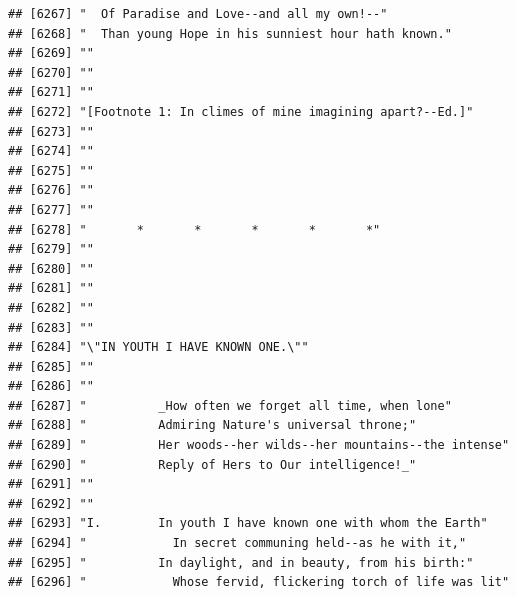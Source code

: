 \documentclass{article}\usepackage[]{graphicx}\usepackage[]{color}
\makeatletter
\newenvironment{kframe}{%
 \def\at@end@of@kframe{}%
 \ifinner\ifhmode%
  \def\at@end@of@kframe{\end{minipage}}%
  \begin{minipage}{\columnwidth}%
 \fi\fi%
 \def\FrameCommand##1{\hskip\@totalleftmargin \hskip-\fboxsep
 \colorbox{shadecolor}{##1}\hskip-\fboxsep
     \hskip-\linewidth \hskip-\@totalleftmargin \hskip\columnwidth}%
 \MakeFramed {\advance\hsize-\width
   \@totalleftmargin\z@ \linewidth\hsize
   \@setminipage}}%
 {\par\unskip\endMakeFramed%
 \at@end@of@kframe}
\newenvironment{knitrout}{}{} %
\makeatother
\begin{document}
\begin{knitrout}
\begin{kframe}
\begin{verbatim}
## [6267] "  Of Paradise and Love--and all my own!--"                                   
## [6268] "  Than young Hope in his sunniest hour hath known."                          
## [6269] ""                                                                            
## [6270] ""                                                                            
## [6271] ""                                                                            
## [6272] "[Footnote 1: In climes of mine imagining apart?--Ed.]"                       
## [6273] ""                                                                            
## [6274] ""                                                                            
## [6275] ""                                                                            
## [6276] ""                                                                            
## [6277] ""                                                                            
## [6278] "       *       *       *       *       *"                                    
## [6279] ""                                                                            
## [6280] ""                                                                            
## [6281] ""                                                                            
## [6282] ""                                                                            
## [6283] ""                                                                            
## [6284] "\"IN YOUTH I HAVE KNOWN ONE.\""                                              
## [6285] ""                                                                            
## [6286] ""                                                                            
## [6287] "          _How often we forget all time, when lone"                          
## [6288] "          Admiring Nature's universal throne;"                               
## [6289] "          Her woods--her wilds--her mountains--the intense"                  
## [6290] "          Reply of Hers to Our intelligence!_"                               
## [6291] ""                                                                            
## [6292] ""                                                                            
## [6293] "I.        In youth I have known one with whom the Earth"                     
## [6294] "            In secret communing held--as he with it,"                        
## [6295] "          In daylight, and in beauty, from his birth:"                       
## [6296] "            Whose fervid, flickering torch of life was lit"                  

\end{verbatim}
\end{kframe}
\end{knitrout}
\end{document}
